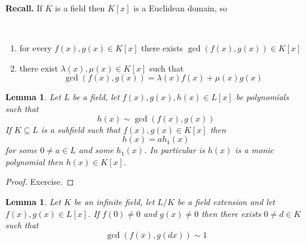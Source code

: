\documentclass[12pt, letterpaper, oneside]{article}
\theoremstyle{plain}
\newtheorem{lemma}[theorem]{Lemma}
\theoremstyle{definition}
\newcommand{\benu}{\begin{enumerate}}
\newcommand{\eenu}{\end{enumerate}}
\newcommand{\vs}{\vskip 5mm}
\begin{document}
\textbf{Recall.} 
If $K$ is a field then $K[x]$ is a Euclidean domain, so 

\vskip -13mm

\ 
\benu
\item for every $f(x), g(x)\in K[x]$ there exists $\gcd(f(x), g(x))\in K[x]$
\item there exist $\lambda(x), \mu(x)\in K[x]$ such that 
$$\gcd(f(x), g(x)) = \lambda(x)f(x) + \mu(x)g(x)$$
\eenu


\vs\vs

\begin{lemma}
\label{LEMMA_GCDINLISINK}
Let $L$ be a field, let $f(x), g(x), h(x)\in L[x]$ be polynomials such that  
$$h(x)\sim \gcd(f(x), g(x))$$
If $K\subseteq L$ is a subfield such that $f(x), g(x)\in K[x]$ then 
$$h(x) = ah_{1}(x)$$
for some $0\neq a\in L$ and some $h_{1}(x)$.  
In particular is $h(x)$ is a monic polynomial then $h(x)\in K[x]$. 
\end{lemma}


\vs

\begin{proof}
Exercise. 
\end{proof}


\vs\vs


\begin{lemma}
\label{LEMMA_GCDFXGDX}
Let $K$ be an infinite field, let $L/K$ be a field extension and let $f(x), g(x)\in L[x]$. 
If $f(0)\neq 0$ and $g(x)\neq 0$ then there exists $0\neq d\in K$ such that 
$$\gcd(f(x), g(dx))\sim 1$$ 
\end{lemma}


\vs
\end{document}
